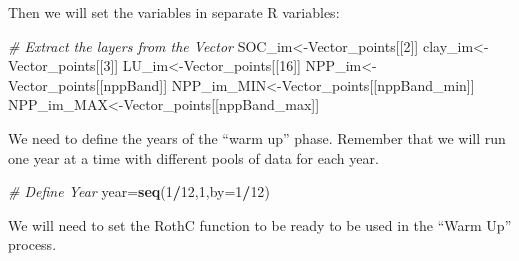 \documentclass[
  10pt,
  b5paper,
]{book}
\newenvironment{Shaded}{\begin{snugshade}}{\end{snugshade}}
\newcommand{\CommentTok}[1]{\textcolor[rgb]{0.56,0.35,0.01}{\textit{#1}}}
\newcommand{\DataTypeTok}[1]{\textcolor[rgb]{0.13,0.29,0.53}{#1}}
\newcommand{\DecValTok}[1]{\textcolor[rgb]{0.00,0.00,0.81}{#1}}
\newcommand{\KeywordTok}[1]{\textcolor[rgb]{0.13,0.29,0.53}{\textbf{#1}}}
\newcommand{\NormalTok}[1]{#1}
\newcommand{\OperatorTok}[1]{\textcolor[rgb]{0.81,0.36,0.00}{\textbf{#1}}}
\begin{document}
Then we will set the variables in separate R variables:

\begin{Shaded}
\begin{Highlighting}[]
\CommentTok{# Extract the layers from the Vector}
\NormalTok{SOC_im<-Vector_points[[}\DecValTok{2}\NormalTok{]] }
\NormalTok{clay_im<-Vector_points[[}\DecValTok{3}\NormalTok{]] }
\NormalTok{LU_im<-Vector_points[[}\DecValTok{16}\NormalTok{]]}
\NormalTok{NPP_im<-Vector_points[[nppBand]]}
\NormalTok{NPP_im_MIN<-Vector_points[[nppBand_min]]}
\NormalTok{NPP_im_MAX<-Vector_points[[nppBand_max]]}
\end{Highlighting}
\end{Shaded}

We need to define the years of the ``warm up'' phase. Remember that we will run one year at a time with different pools of data for each year.

\begin{Shaded}
\begin{Highlighting}[]
\CommentTok{# Define Year }
\NormalTok{year=}\KeywordTok{seq}\NormalTok{(}\DecValTok{1}\OperatorTok{/}\DecValTok{12}\NormalTok{,}\DecValTok{1}\NormalTok{,}\DataTypeTok{by=}\DecValTok{1}\OperatorTok{/}\DecValTok{12}\NormalTok{)}
\end{Highlighting}
\end{Shaded}

We will need to set the RothC function to be ready to be used in the ``Warm Up'' process.
\end{document}
